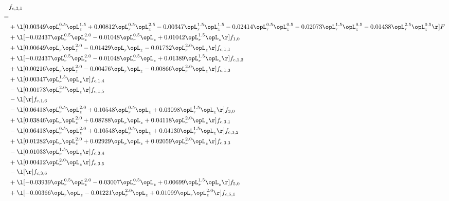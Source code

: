 \begin{alignat}{2} 
\label{eq:f_31_1} 
& f_{c,3,1} \nonumber \\ 
 = \\ 
& + \l[  0.00349 \opL_r^{0.5} \opL_z^{1.5} +  0.00812 \opL_r^{0.5} \opL_z^{2.5}   -0.00347 \opL_r^{1.5} \opL_z^{1.5}   -0.02414 \opL_r^{0.5} \opL_z^{0.5}   -0.02073 \opL_r^{1.5} \opL_z^{0.5}   -0.01438 \opL_r^{2.5} \opL_z^{0.5}  \r] F \nonumber \\ 
& + \l[  -0.02437 \opL_r^{0.5} \opL_z^{2.0}   -0.01048 \opL_r^{0.5} \opL_z +  0.01042 \opL_r^{1.5} \opL_z  \r] f_{1,0} \nonumber \\ 
& + \l[  0.00649 \opL_r \opL_z^{2.0}   -0.01429 \opL_r \opL_z   -0.01732 \opL_r^{2.0} \opL_z  \r] f_{c,1,1} \nonumber \\ 
& + \l[  -0.02437 \opL_r^{0.5} \opL_z^{2.0}   -0.01048 \opL_r^{0.5} \opL_z +  0.01389 \opL_r^{1.5} \opL_z  \r] f_{c,1,2} \nonumber \\ 
& + \l[  0.00216 \opL_r \opL_z^{2.0}   -0.00476 \opL_r \opL_z   -0.00866 \opL_r^{2.0} \opL_z  \r] f_{c,1,3} \nonumber \\ 
& + \l[  0.00347 \opL_r^{1.5} \opL_z  \r] f_{c,1,4} \nonumber \\ 
& - \l[  0.00173 \opL_r^{2.0} \opL_z  \r] f_{c,1,5} \nonumber \\ 
& - \l[  \r] f_{c,1,6} \nonumber \\ 
& - \l[  0.06418 \opL_r^{0.5} \opL_z^{2.0} +  0.10548 \opL_r^{0.5} \opL_z +  0.03098 \opL_r^{1.5} \opL_z  \r] f_{3,0} \nonumber \\ 
& + \l[  0.03846 \opL_r \opL_z^{2.0} +  0.08788 \opL_r \opL_z +  0.04118 \opL_r^{2.0} \opL_z  \r] f_{c,3,1} \nonumber \\ 
& - \l[  0.06418 \opL_r^{0.5} \opL_z^{2.0} +  0.10548 \opL_r^{0.5} \opL_z +  0.04130 \opL_r^{1.5} \opL_z  \r] f_{c,3,2} \nonumber \\ 
& + \l[  0.01282 \opL_r \opL_z^{2.0} +  0.02929 \opL_r \opL_z +  0.02059 \opL_r^{2.0} \opL_z  \r] f_{c,3,3} \nonumber \\ 
& - \l[  0.01033 \opL_r^{1.5} \opL_z  \r] f_{c,3,4} \nonumber \\ 
& + \l[  0.00412 \opL_r^{2.0} \opL_z  \r] f_{c,3,5} \nonumber \\ 
& - \l[  \r] f_{c,3,6} \nonumber \\ 
& + \l[  -0.03939 \opL_r^{0.5} \opL_z^{2.0}   -0.03007 \opL_r^{0.5} \opL_z +  0.00699 \opL_r^{1.5} \opL_z  \r] f_{5,0} \nonumber \\ 
& + \l[  -0.00366 \opL_r \opL_z   -0.01221 \opL_r^{2.0} \opL_z +  0.01099 \opL_r \opL_z^{2.0}  \r] f_{c,5,1} \nonumber \\ 

\end{alignat}

